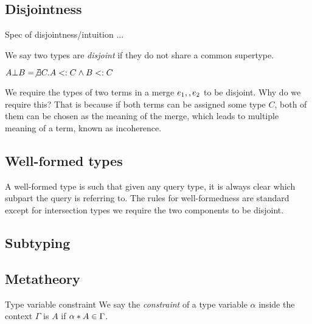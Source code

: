 \documentclass[nocopyrightspace,preprint,times,9pt]{sigplanconf}
\begin{document}
\subsection{Disjointness}

Spec of disjointness/intuition ...

We say two types are \emph{disjoint} if they do not share a common supertype.

\begin{definition}[Disjointness]
$A \bot B = \not \exists C. A <: C \wedge B <: C$
\end{definition}

We require the types of two terms in a merge $e_1 ,, e_2$ to be disjoint. Why do we require this? That is because if both terms can be assigned some type $C$, both of them can be chosen as the meaning of the merge, which leads to multiple meaning of a term, known as incoherence.

\subsection{Well-formed types}

A well-formed type is such that given any query type, it is always clear which subpart the query is referring to. The rules for well-formedness are standard except for intersection types we require the two components to be disjoint.

\subsection{Subtyping}

\subsection{Metatheory}

\begin{definition}{Type variable constraint}
We say the \emph{constraint} of a type variable $\alpha$ inside the context $\Gamma$ is $A$ if $\alpha * A \in \Gamma$.
\end{definition}

%
\end{document}
